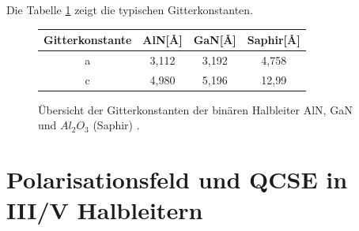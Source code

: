%
Die Tabelle \ref{table:tab1} zeigt die typischen Gitterkonstanten.
\begin{figure}[H]
\centering
\begin{tabular}{|c|c|c|c|}
\hline
\multicolumn{1}{|l|}{Gitterkonstante} & AlN[\AA] & GaN[\AA] & Saphir[\AA] \\ \hline \hline
a & 3,112 & 3,192 & 4,758 \\ \hline
c & 4,980 & 5,196 & 12,99 \\ \hline
\end{tabular}
\caption{Übersicht der Gitterkonstanten der binären Halbleiter AlN, GaN und $Al_{2}O_{3}$ (Saphir) \cite{pohl}. }
\label{table:tab1}
\end{figure}

\section{Polarisationsfeld und QCSE in III/V Halbleitern}

